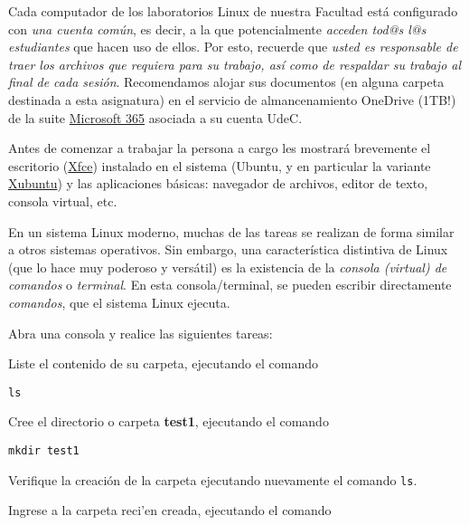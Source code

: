 \documentclass[11pt]{exam}
\begin{document}
\begin{questions}

\item Cada computador de los laboratorios Linux de nuestra Facultad está configurado con \textit{una cuenta común}, es decir, a la que potencialmente \textit{acceden tod@s l@s estudiantes} que hacen uso de ellos. Por esto, recuerde que \textit{usted es responsable de traer los archivos que requiera para su trabajo, así como de respaldar su trabajo al final de cada sesión}. Recomendamos alojar sus documentos (en alguna carpeta destinada a esta asignatura) en el servicio de almancenamiento OneDrive (1TB!) de la suite \href{https://www.office.com/}{Microsoft 365} asociada a su cuenta UdeC.

\item Antes de comenzar a trabajar la persona a cargo les mostrar\'a brevemente
el escritorio (\href{http://www.xfce.org/?lang=es}{Xfce}) instalado en el sistema (Ubuntu, y en particular la variante \href{http://xubuntu.org/}{Xubuntu}) y las aplicaciones b\'asicas: navegador de archivos, editor de texto, consola virtual, etc.

\item En un sistema Linux moderno, muchas de las tareas se realizan de forma similar a otros sistemas operativos. Sin embargo, una característica distintiva de Linux (que lo hace muy poderoso y versátil) es la existencia de la \textit{consola (virtual) de comandos} o \textit{terminal}. En esta consola/terminal, se pueden escribir directamente \textit{comandos}, que el sistema Linux ejecuta. 

Abra una consola y realice las siguientes tareas:
\begin{parts}
\item Liste el contenido de su carpeta, ejecutando el comando 

\begin{verbatim}
ls
\end{verbatim}

\item Cree el directorio o carpeta \textbf{test1}, ejecutando el comando 

\begin{verbatim}
mkdir test1
\end{verbatim}

Verifique la creación de la carpeta ejecutando nuevamente el comando \texttt{ls}.

\item Ingrese a la carpeta reci'en creada, ejecutando el comando 


\end{parts}
\end{questions}
\end{document}
